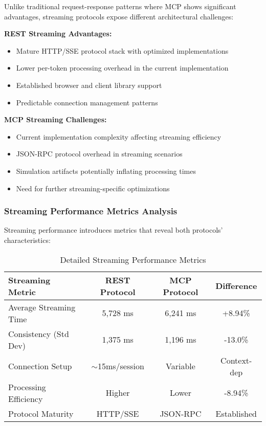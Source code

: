Unlike traditional request-response patterns where MCP shows significant advantages, streaming protocols expose different architectural challenges:

\textbf{REST Streaming Advantages:}
\begin{itemize}
    \item Mature HTTP/SSE protocol stack with optimized implementations
    \item Lower per-token processing overhead in the current implementation
    \item Established browser and client library support
    \item Predictable connection management patterns
\end{itemize}

\textbf{MCP Streaming Challenges:}
\begin{itemize}
    \item Current implementation complexity affecting streaming efficiency
    \item JSON-RPC protocol overhead in streaming scenarios
    \item Simulation artifacts potentially inflating processing times
    \item Need for further streaming-specific optimizations
\end{itemize}

\subsubsection{Streaming Performance Metrics Analysis}

Streaming performance introduces metrics that reveal both protocols' characteristics:

\begin{table}[h]
\centering
\caption{Detailed Streaming Performance Metrics}
\begin{tabular}{|l|c|c|c|}
\hline
\textbf{Streaming Metric} & \textbf{REST Protocol} & \textbf{MCP Protocol} & \textbf{Difference} \\
\hline
Average Streaming Time & 5,728 ms & 6,241 ms & +8.94\% \\
\hline
Consistency (Std Dev) & 1,375 ms & 1,196 ms & -13.0\% \\
\hline
Connection Setup & $\sim$15ms/session & Variable & Context-dep \\
\hline
Processing Efficiency & Higher & Lower & -8.94\% \\
\hline
Protocol Maturity & HTTP/SSE & JSON-RPC & Established \\
\hline
\end{tabular}
\end{table}

